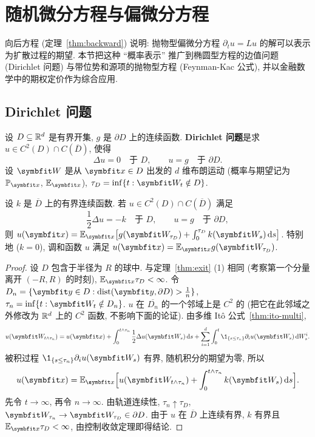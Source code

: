 \section{随机微分方程与偏微分方程}
\label{sec:6-4}

向后方程 (定理~\ref{thm:backward}) 说明: 抛物型偏微分方程 $\partial_tu=Lu$ 的解可以表示为扩散过程的期望. 本节把这种 ``概率表示'' 推广到椭圆型方程的边值问题 (Dirichlet 问题) 与带位势和源项的抛物型方程 (Feynman-Kac 公式), 并以金融数学中的期权定价作为综合应用.

\subsection{Dirichlet 问题}

设 $D\subseteq\mathbb{R}^d$ 是有界开集, $g$ 是 $\partial D$ 上的连续函数. \textbf{Dirichlet 问题}是求 $u\in C^2(D)\cap C(\overline{D})$, 使得
\[
\Delta u=0\quad\text{于 }D,\qquad u=g\quad\text{于 }\partial D.
\]
设 $\rvec{W}$ 是从 $\rvec{x}\in D$ 出发的 $d$ 维布朗运动 (概率与期望记为 $\P_{\rvec{x}}$, $\E_{\rvec{x}}$), $\tau_D=\inf\{t:\rvec{W}_t\notin D\}$.

\begin{theorem}\label{thm:dirichlet}
设 $k$ 是 $\overline{D}$ 上的有界连续函数. 若 $u\in C^2(D)\cap C(\overline{D})$ 满足
\[
\frac{1}{2}\Delta u=-k\quad\text{于 }D,\qquad u=g\quad\text{于 }\partial D,
\]
则 $u(\rvec{x})=\E_{\rvec{x}}\big[g(\rvec{W}_{\tau_D})+\int_0^{\tau_D}k(\rvec{W}_s)\dd s\big]$. 特别地 ($k=0$), 调和函数 $u$ 满足 $u(\rvec{x})=\E_{\rvec{x}}g(\rvec{W}_{\tau_D})$.
\end{theorem}

\begin{proof}
设 $D$ 包含于半径为 $R$ 的球中. 与定理~\ref{thm:exit} (1) 相同 (考察第一个分量离开 $(-R,R)$ 的时刻), $\E_{\rvec{x}}\tau_D<\infty$. 令 $D_n=\{\rvec{y}\in D:\operatorname{dist}(\rvec{y},\partial D)>\frac{1}{n}\}$, $\tau_n=\inf\{t:\rvec{W}_t\notin D_n\}$. $u$ 在 $\overline{D_n}$ 的一个邻域上是 $C^2$ 的 (把它在此邻域之外修改为 $\mathbb{R}^d$ 上的 $C^2$ 函数, 不影响下面的论证). 由多维 It\^o 公式~\ref{thm:ito-multi},
\[
u(\rvec{W}_{t\wedge\tau_n})=u(\rvec{x})+\int_0^{t\wedge\tau_n}\frac{1}{2}\Delta u(\rvec{W}_s)\dd s+\sum_{i=1}^d\int_0^t\1_{\{s\le\tau_n\}}\partial_iu(\rvec{W}_s)\dd W^i_s.
\]
被积过程 $\1_{\{s\le\tau_n\}}\partial_iu(\rvec{W}_s)$ 有界, 随机积分的期望为零, 所以
\[
u(\rvec{x})=\E_{\rvec{x}}\Big[u(\rvec{W}_{t\wedge\tau_n})+\int_0^{t\wedge\tau_n}k(\rvec{W}_s)\dd s\Big].
\]
先令 $t\to\infty$, 再令 $n\to\infty$. 由轨道连续性, $\tau_n\uparrow\tau_D$, $\rvec{W}_{\tau_n}\to\rvec{W}_{\tau_D}\in\partial D$. 由于 $u$ 在 $\overline{D}$ 上连续有界, $k$ 有界且 $\E_{\rvec{x}}\tau_D<\infty$, 由控制收敛定理即得结论.
\end{proof}

